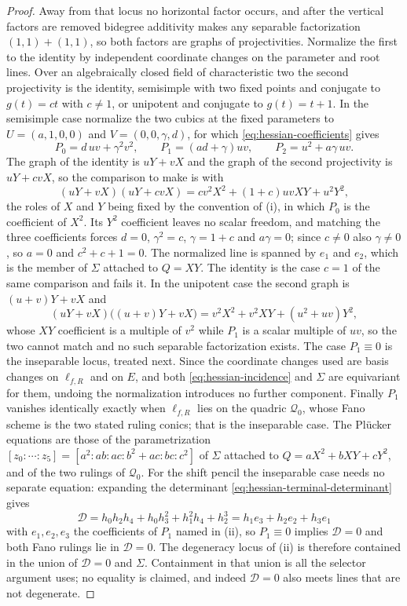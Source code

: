 \begin{proof}
Away from that locus no horizontal factor occurs, and after the vertical
factors are removed bidegree additivity makes any separable
factorization $(1,1)+(1,1)$, so both factors are graphs of projectivities.
Normalize the first to the identity by independent coordinate changes on the
parameter and root lines.  Over an algebraically closed field of characteristic
two the second projectivity is the identity, semisimple with two fixed points
and conjugate to $g(t)=ct$ with $c\neq1$, or unipotent and conjugate to
$g(t)=t+1$.  In the semisimple case normalize the two cubics at the fixed
parameters to $U=(a,1,0,0)$ and $V=(0,0,\gamma,d)$, for which
\eqref{eq:hessian-coefficients} gives
\[
 P_0=d\,uv+\gamma^2v^2,\qquad
 P_1=(ad+\gamma)uv,\qquad
 P_2=u^2+a\gamma\,uv .
\]
The graph of the identity is $uY+vX$ and the graph of the second projectivity
is $uY+cvX$, so the comparison to make is with
\[
 (uY+vX)(uY+cvX)=cv^2X^2+(1+c)uvXY+u^2Y^2 ,
\]
the roles of $X$ and $Y$ being fixed by the convention of (i), in which
$P_0$ is the coefficient of $X^2$.  Its $Y^2$ coefficient leaves no scalar
freedom, and matching the three coefficients forces $d=0$, $\gamma^2=c$,
$\gamma=1+c$ and $a\gamma=0$; since $c\neq0$ also $\gamma\neq0$, so $a=0$ and
$c^2+c+1=0$.  The normalized line
is spanned by $e_1$ and $e_2$, which is the member of $\Sigma$ attached to
$Q=XY$.  The identity is the case $c=1$ of the same comparison and fails it.
In the unipotent case the second graph is $(u+v)Y+vX$ and
\[
 (uY+vX)\bigl((u+v)Y+vX\bigr)=v^2X^2+v^2XY+(u^2+uv)Y^2 ,
\]
whose $XY$ coefficient is a multiple of $v^2$ while $P_1$ is a scalar multiple
of $uv$, so the two cannot match and no such separable factorization exists.
The case $P_1\equiv0$ is the inseparable locus, treated next.  Since the
coordinate changes used are basis changes on $\ell_{f,R}$ and on $E$, and both
\eqref{eq:hessian-incidence} and $\Sigma$ are equivariant for them, undoing the
normalization introduces no further component.  Finally $P_1$ vanishes
identically exactly when $\ell_{f,R}$ lies on the quadric $\mathcal Q_0$, whose Fano
scheme is the two stated ruling conics; that is the inseparable case.  The
Pl\"ucker equations are those of the parametrization
$[z_0:\cdots:z_5]=[a^2:ab:ac:b^2+ac:bc:c^2]$ of $\Sigma$ attached to
$Q=aX^2+bXY+cY^2$, and of the two rulings of $\mathcal Q_0$.  For the shift
pencil the inseparable case needs no separate equation: expanding the
determinant \eqref{eq:hessian-terminal-determinant} gives
\[
 \mathcal D=h_0h_2h_4+h_0h_3^2+h_1^2h_4+h_2^3
 =h_1e_3+h_2e_2+h_3e_1
\]
with $e_1,e_2,e_3$ the coefficients of $P_1$ named in (ii), so $P_1\equiv0$
implies $\mathcal D=0$ and both Fano rulings lie in $\mathcal D=0$.  The
degeneracy locus of (ii) is therefore contained in the union of
$\mathcal D=0$ and $\Sigma$.  Containment in that union is all the selector
argument uses; no equality is claimed, and indeed $\mathcal D=0$ also meets
lines that are not degenerate.


\end{proof}
